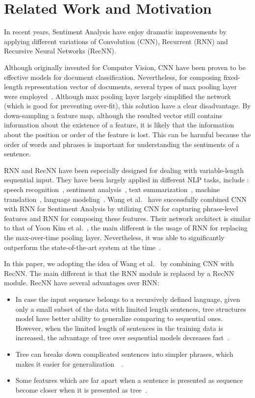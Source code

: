 \section{Related Work and Motivation}
In recent years, Sentiment Analysis have enjoy dramatic improvements by applying different variations of Convolution (CNN), Recurrent (RNN) and Recursive Neural Networks (RecNN). 

Although originally invented for Computer Vision, CNN have been proven to be effective models for document classification.
Nevertheless, for composing fixed-length representation vector of documents, several types of max pooling layer were employed~\cite{nlp-scratch ,KimCNN, DCNN, 2-layer-cnn}.
Although max pooling layer largely simplified the network (which is good for preventing over-fit), this solution have a clear disadvantage.
By down-sampling a feature map, although the resulted vector still contains information about the existence of a feature, it is likely that the information about the position or order of the feature is lost.
This can be harmful because the order of words and phrases is important for understanding the sentiments of a sentence.

RNN and RecNN have been especially designed for dealing with variable-length sequential input. 
They have been largely applied in different NLP tasks, include : speech recognition~\cite{speech-lstm, MiaoGM15}, sentiment analysis~\cite{treeLSTM, attention-gru}, text summarization~\cite{RushCW15, NallapatiXZ16}, machine translation~\cite{FiratCB16, SutskeverVL14, BritzGLL17}, language modeling~\cite{mikolov-nlm, JozefowiczVSSW16}.
Wang et al.~\cite{cnn-rnn} have successfully combined CNN with RNN for Sentiment Analysis by utilizing CNN for capturing phrase-level features and RNN for composing these features.
Their network architect is similar to that of Yoon Kim et al.~\cite{KimCNN}, the main different is the usage of RNN for replacing the max-over-time pooling layer.
Nevertheless, it was able to significantly outperform the state-of-the-art system at the time~\cite{cnn-rnn}.

In this paper, we adopting the idea of Wang et al.~\cite{cnn-rnn} by combining CNN with RecNN.
The main different is that the RNN module is replaced by a RecNN module.
RecNN have several advantages over RNN:
\begin{itemize}
	\item In case the input sequence belongs to a recursively defined language, given only a small subset of the data with limited length sentences, tree structures model have better ability to generalize comparing to sequential ones.
	However, when the limited length of sentences in the training data is increased, the advantage of tree over sequential models decreases fast~\cite{bowman-treevslstm}.
	\item Tree can breaks down complicated sentences into simpler phrases, which makes it easier for generalization~\cite{knowledge-matter}~\cite{need-tree}.
	\item Some features which are far apart when a sentence is presented as sequence become closer when it is presented as tree~\cite{need-tree}.
\end{itemize}

